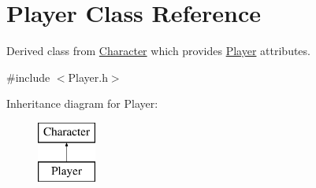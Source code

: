 \hypertarget{classPlayer}{\section{Player Class Reference}
\label{classPlayer}
}


Derived class from \hyperlink{classCharacter}{Character} which provides \hyperlink{classPlayer}{Player} attributes.  




{\ttfamily \#include $<$Player.\-h$>$}

Inheritance diagram for Player\-:\begin{figure}[H]
\begin{center}
\leavevmode
\includegraphics[height=2.000000cm]{classPlayer}
\end{center}
\end{figure}
